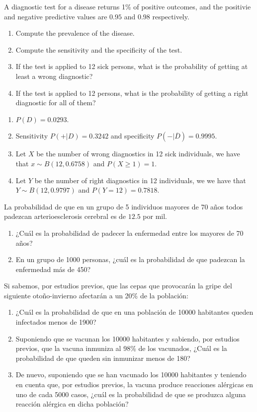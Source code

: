 {A diagnostic test for a disease returns 1\% of positive outcomes, and the positivie and negative predictive values are $0.95$ and $0.98$ respectively. 
\begin{enumerate}
\item Compute the prevalence of the disease.
\item Compute the sensitivity and the specificity of the test.
\item If the test is applied to 12 sick persons, what is the probability of getting at least a wrong diagnostic?
\item If the test is applied to 12 persons, what is the probability of getting a right diagnostic for all of them?
\end{enumerate}
} 
{
\begin{enumerate}
\item $P(D)=0.0293$.
\item Sensitivity $P(+|D)=0.3242$ and specificity $P(-|\overline D)=0.9995$. 
\item Let $X$ be the number of wrong diagnostics in 12 sick individuals, we have that $x\sim B(12,0.6758)$ and $P(X\geq 1)=1$. 
\item Let $Y$ be the number of right diagnostics in 12 individuals, we we have that $Y\sim B(12,0.9797)$ and $P(Y=12)=0.7818$. 
\end{enumerate}
}
{
}


{La probabilidad de que en un grupo de 5 individuos mayores de 70 años todos padezcan arterioesclerosis cerebral es de $12.5$ por mil.
\begin{enumerate}
\item ¿Cuál es la probabilidad de padecer la enfermedad entre los mayores de 70 años?
\item En un grupo de 1000 personas, ¿cuál es la probabilidad de que padezcan la enfermedad más de 450?
\end{enumerate}
} 
{
}
{
}


{Si sabemos, por estudios previos, que las cepas que provocarán la gripe del siguiente otoño-invierno afectarán a un 20\% de la
población:
\begin{enumerate}
\item ¿Cuál es la probabilidad de que en una población de 10000 habitantes queden infectados menos de 1900?
\item Suponiendo que se vacunan los 10000 habitantes y sabiendo, por estudios previos, que la vacuna inmuniza al 98\% de los vacunados,
¿Cuál es la probabilidad de que queden sin inmunizar menos de 180?
\item De nuevo, suponiendo que se han vacunado los 10000 habitantes y teniendo en cuenta que, por estudios previos, la vacuna produce
reacciones alérgicas en uno de cada 5000 casos, ¿cuál es la probabilidad de que se produzca alguna reacción alérgica en dicha población?
\end{enumerate}
} 
{
}
{
}

